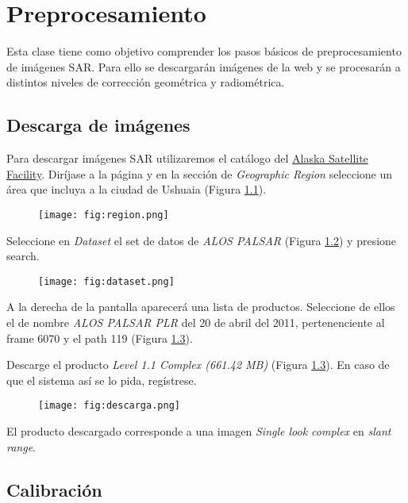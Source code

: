 \chapter{Preprocesamiento}

Esta clase tiene como objetivo comprender los pasos básicos de preprocesamiento de imágenes SAR. Para ello se descargarán imágenes de la web y se procesarán a distintos niveles de corrección geométrica y radiométrica.

\section{Descarga de imágenes}

Para descargar imágenes SAR utilizaremos el catálogo del \href{https://vertex.daac.asf.alaska.edu/}{Alaska Satellite Facility}. Diríjase a la página y en la sección de \emph{Geographic Region} seleccione un área que incluya a la ciudad de Ushuaia (Figura \ref{fig:region}).

\begin{figure}[h!]
    \centering
    \texttt{[image: fig:region.png]}
    \caption{}
    \label{fig:region}
\end{figure}

Seleccione en \emph{Dataset} el set de datos de \emph{ALOS PALSAR} (Figura \ref{fig:dataset}) y presione search.

\begin{figure}[h!]
    \centering
    \texttt{[image: fig:dataset.png]}
    \caption{}
    \label{fig:dataset}
\end{figure}

A la derecha de la pantalla aparecerá una lista de productos. Seleccione de ellos el de nombre \emph{ALOS PALSAR PLR} del 20 de abril del 2011, pertenenciente al frame 6070 y el path 119 (Figura \ref{fig:descarga}).

Descarge el producto \emph{Level 1.1 Complex (661.42 MB)} (Figura \ref{fig:descarga}). En caso de que el sistema así se lo pida, regístrese.

\begin{figure}[h!]
    \centering
    \texttt{[image: fig:descarga.png]}
    \caption{}
    \label{fig:descarga}
\end{figure}

El producto descargado corresponde a una imagen \emph{Single look complex} en \emph{slant range}.

\section{Calibración}


